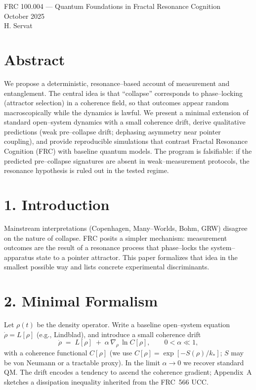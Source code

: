 \documentclass[10pt]{article}
\begin{document}
\begin{center}
{\Large FRC 100.004 — Quantum Foundations in Fractal Resonance Cognition}\\
{\large October 2025}\\[4pt]
H. Servat
\end{center}

\section*{Abstract}
We propose a deterministic, resonance--based account of measurement and entanglement. The central idea is that ``collapse'' corresponds to phase--locking (attractor selection) in a coherence field, so that outcomes appear random macroscopically while the dynamics is lawful. We present a minimal extension of standard open--system dynamics with a small coherence drift, derive qualitative predictions (weak pre--collapse drift; dephasing asymmetry near pointer coupling), and provide reproducible simulations that contrast Fractal Resonance Cognition (FRC) with baseline quantum models. The program is falsifiable: if the predicted pre--collapse signatures are absent in weak--measurement protocols, the resonance hypothesis is ruled out in the tested regime.

\section*{1. Introduction}
Mainstream interpretations (Copenhagen, Many--Worlds, Bohm, GRW) disagree on the nature of collapse. FRC posits a simpler mechanism: measurement outcomes are the result of a resonance process that phase--locks the system--apparatus state to a pointer attractor. This paper formalizes that idea in the smallest possible way and lists concrete experimental discriminants.

\section*{2. Minimal Formalism}
Let $\rho(t)$ be the density operator. Write a baseline open--system equation $\dot\rho=L[\rho]$ (e.g., Lindblad), and introduce a small coherence drift
\begin{equation}
\dot\rho \;=\; L[\rho]\; +\; \alpha\,\nabla_{\rho}\,\ln C[\rho], \qquad 0<\alpha\ll 1,
\end{equation}
with a coherence functional $C[\rho]$ (we use $C[\rho]=\exp[-S(\rho)/k_*]$; $S$ may be von Neumann or a tractable proxy). In the limit $\alpha\to 0$ we recover standard QM. The drift encodes a tendency to ascend the coherence gradient; Appendix~A sketches a dissipation inequality inherited from the FRC~566 UCC.
\end{document}
